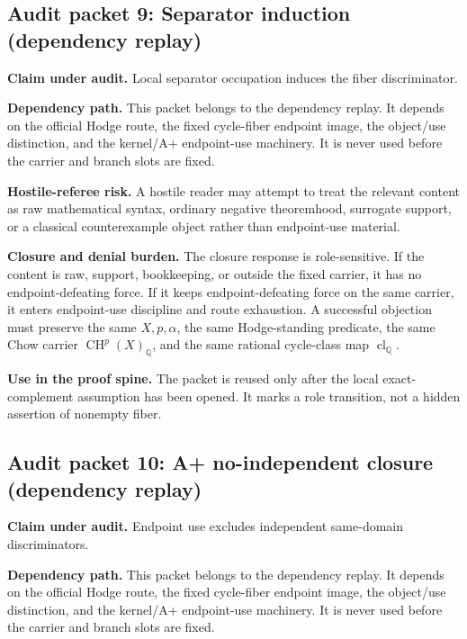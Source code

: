 \documentclass[11pt]{article}
\newcommand{\QQ}{\mathbb{Q}}
\newcommand{\CH}{\operatorname{CH}}
\newcommand{\clQ}{\operatorname{cl}_{\QQ}}
\begin{document}
\subsection{Audit packet 9: Separator induction (dependency replay)}


\par\noindent\textbf{Claim under audit.} Local separator occupation induces the fiber discriminator.


\par\noindent\textbf{Dependency path.} This packet belongs to the dependency replay. It depends on the official Hodge route, the fixed cycle-fiber endpoint image, the object/use distinction, and the kernel/A+ endpoint-use machinery. It is never used before the carrier and branch slots are fixed.


\par\noindent\textbf{Hostile-referee risk.} A hostile reader may attempt to treat the relevant content as raw mathematical syntax, ordinary negative theoremhood, surrogate support, or a classical counterexample object rather than endpoint-use material.


\par\noindent\textbf{Closure and denial burden.} The closure response is role-sensitive. If the content is raw, support, bookkeeping, or outside the fixed carrier, it has no endpoint-defeating force. If it keeps endpoint-defeating force on the same carrier, it enters endpoint-use discipline and route exhaustion. A successful objection must preserve the same $X,p,\alpha$, the same Hodge-standing predicate, the same Chow carrier $\CH^p(X)_\QQ$, and the same rational cycle-class map $\clQ$.


\par\noindent\textbf{Use in the proof spine.} The packet is reused only after the local exact-complement assumption has been opened. It marks a role transition, not a hidden assertion of nonempty fiber.


\subsection{Audit packet 10: A+ no-independent closure (dependency replay)}


\par\noindent\textbf{Claim under audit.} Endpoint use excludes independent same-domain discriminators.


\par\noindent\textbf{Dependency path.} This packet belongs to the dependency replay. It depends on the official Hodge route, the fixed cycle-fiber endpoint image, the object/use distinction, and the kernel/A+ endpoint-use machinery. It is never used before the carrier and branch slots are fixed.
\end{document}
